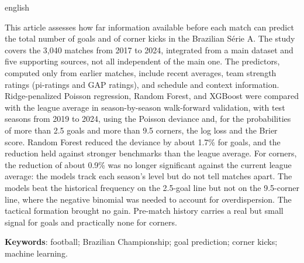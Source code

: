 \begin{otherlanguage*}{english}

This article assesses how far information available before each match can predict the total number of goals and of corner kicks in the Brazilian Série A. The study covers the 3,040 matches from 2017 to 2024, integrated from a main dataset and five supporting sources, not all independent of the main one. The predictors, computed only from earlier matches, include recent averages, team strength ratings (pi-ratings and GAP ratings), and schedule and context information. Ridge-penalized Poisson regression, Random Forest, and XGBoost were compared with the league average in season-by-season walk-forward validation, with test seasons from 2019 to 2024, using the Poisson deviance and, for the probabilities of more than 2.5 goals and more than 9.5 corners, the log loss and the Brier score. Random Forest reduced the deviance by about 1.7\% for goals, and the reduction held against stronger benchmarks than the league average. For corners, the reduction of about 0.9\% was no longer significant against the current league average: the models track each season's level but do not tell matches apart. The models beat the historical frequency on the 2.5-goal line but not on the 9.5-corner line, where the negative binomial was needed to account for overdispersion. The tactical formation brought no gain. Pre-match history carries a real but small signal for goals and practically none for corners.

\vspace{\onelineskip}

\noindent
\textbf{Keywords}: football; Brazilian Championship; goal prediction; corner kicks; machine learning.

\end{otherlanguage*}